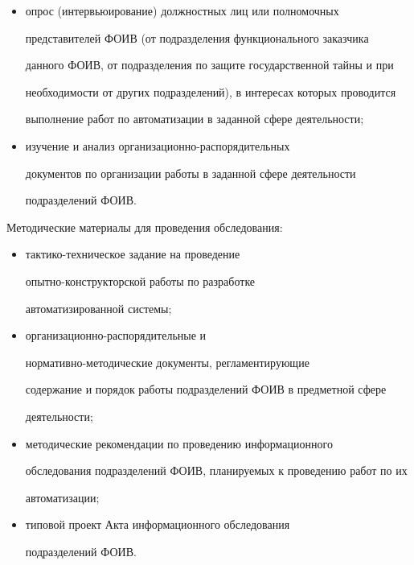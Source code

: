       \begin{itemize}


      \item опрос (интервьюирование) должностных лиц или полномочных 


представителей ФОИВ (от подразделения функционального заказчика 


данного ФОИВ, от подразделения по защите государственной тайны и при 


необходимости от других подразделений), в интересах которых проводится 


выполнение работ по автоматизации в заданной сфере деятельности;


      \item изучение и анализ организационно-рас\-по\-ря\-ди\-тель\-ных 


документов по организации работы в заданной сфере деятельности 


подразделений ФОИВ.


      \end{itemize}


      


      Методические материалы для проведения обследования:


      \begin{itemize}


      \item  тактико-техническое задание на проведение 


      опыт\-но-кон\-ст\-рук\-тор\-ской работы по разработке 


автоматизированной системы;


      \item организационно-распорядительные и 


      нор\-ма\-тив\-но-ме\-то\-ди\-че\-ские  документы, регламентирующие 


содержание и порядок работы подразделений ФОИВ в предметной сфере 


деятельности;


      \item методические рекомендации по проведению информационного 


обследования подразделений ФОИВ, планируемых к проведению работ по их 


автоматизации;


      \item типовой проект Акта информационного обследования 


подразделений \mbox{ФОИВ}.


      \end{itemize}


